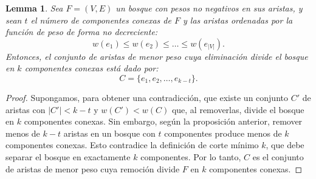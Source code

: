 \documentclass[12pt]{article}
\newtheorem{lemma}{Lemma}
\begin{document}
\begin{lemma}
Sea \( F = (V, E) \) un bosque con pesos no negativos en sus aristas, y sean \( t \) el número de componentes conexas de \( F \) y las aristas ordenadas por la función de peso de forma no decreciente:
\[
w(e_1) \le w(e_2) \le \dots \le w(e_{|V|}).
\]
Entonces, el conjunto de aristas de menor peso cuya eliminación divide el bosque en \( k \) componentes conexas está dado por:
\[
C = \{ e_1, e_2, \dots, e_{k-t} \}.
\]
\end{lemma}

\begin{proof}
Supongamos, para obtener una contradicción, que existe un conjunto \( C' \) de aristas con \( |C'| < k-t \) y \( w(C') < w(C) \) que, al removerlas, divide el bosque en \( k \) componentes conexas.  
Sin embargo, según la proposición anterior, remover menos de \( k-t \) aristas en un bosque con \( t \) componentes produce menos de \( k \) componentes conexas.  
Esto contradice la definición de corte mínimo \( k \), que debe separar el bosque en exactamente \( k \) componentes.  
Por lo tanto, \( C \) es el conjunto de aristas de menor peso cuya remoción divide \( F \) en \( k \) componentes conexas.
\end{proof}
\end{document}
